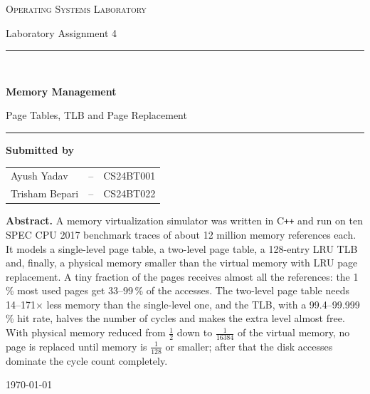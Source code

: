 \documentclass[11pt,a4paper]{article}
\begin{document}
\begin{titlepage}
\centering
\vspace*{1.2cm}
{\large\scshape Operating Systems Laboratory\par}
\vspace{0.3cm}
{\large Laboratory Assignment 4\par}
\vspace{2.4cm}
\rule{\textwidth}{1.2pt}\\[0.55cm]
{\Huge\bfseries Memory Management\par}
\vspace{0.35cm}
{\LARGE Page Tables, TLB and Page Replacement\par}
\vspace{0.55cm}
\rule{\textwidth}{1.2pt}
\vspace{2.6cm}

{\large\bfseries Submitted by\par}
\vspace{0.7cm}
{\large
\begin{tabular}{@{}lcl@{}}
Ayush Yadav       & \quad--\quad & CS24BT001\\[2mm]
Trisham Bepari    & \quad--\quad & CS24BT022\\
\end{tabular}\par}

\vfill
\begin{minipage}{0.88\textwidth}
\small
\noindent\textbf{Abstract.} A memory virtualization simulator was written in C\texttt{++} and run on
ten SPEC CPU 2017 benchmark traces of about 12 million memory references each. It models a single-level
page table, a two-level page table, a 128-entry LRU TLB and, finally, a physical memory smaller
than the virtual memory with LRU page replacement. A tiny fraction of the pages receives almost
all the references: the 1\,\% most used pages get 33--99\,\% of the accesses. The two-level page
table needs 14--171$\times$ less memory than the single-level one, and the TLB, with a 99.4--99.999\,\%
hit rate, halves the number of cycles and makes the extra level almost free. With physical memory
reduced from $\frac{1}{2}$ down to $\frac{1}{16384}$ of the virtual memory, no page is replaced
until memory is $\frac{1}{128}$ or smaller; after that the disk accesses dominate the cycle count
completely.
\end{minipage}
\vspace{1.2cm}

{\large \today\par}
\end{titlepage}
\end{document}
